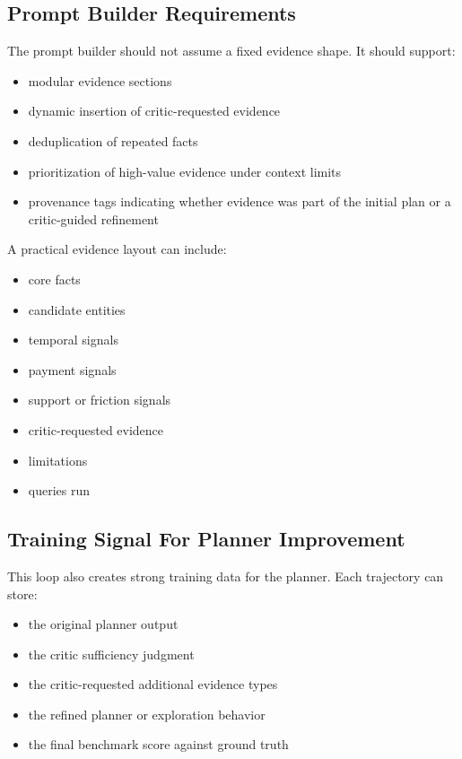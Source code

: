 \documentclass[11pt]{book}
\begin{document}
\subsection*{Prompt Builder Requirements}
The prompt builder should not assume a fixed evidence shape. It should support:

\begin{itemize}
\item modular evidence sections
\item dynamic insertion of critic-requested evidence
\item deduplication of repeated facts
\item prioritization of high-value evidence under context limits
\item provenance tags indicating whether evidence was part of the initial plan or a critic-guided refinement
\end{itemize}

A practical evidence layout can include:

\begin{itemize}
\item core facts
\item candidate entities
\item temporal signals
\item payment signals
\item support or friction signals
\item critic-requested evidence
\item limitations
\item queries run
\end{itemize}

\subsection*{Training Signal For Planner Improvement}
This loop also creates strong training data for the planner. Each trajectory can store:

\begin{itemize}
\item the original planner output
\item the critic sufficiency judgment
\item the critic-requested additional evidence types
\item the refined planner or exploration behavior
\item the final benchmark score against ground truth
\end{itemize}
\end{document}
